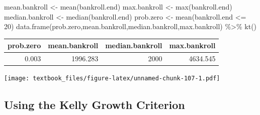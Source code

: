 \documentclass[
  11pt,
]{book}
\newenvironment{Shaded}{\begin{snugshade}}{\end{snugshade}}
\newcommand{\AttributeTok}[1]{\textcolor[rgb]{0.77,0.63,0.00}{#1}}
\newcommand{\DecValTok}[1]{\textcolor[rgb]{0.00,0.00,0.81}{#1}}
\newcommand{\FunctionTok}[1]{\textcolor[rgb]{0.00,0.00,0.00}{#1}}
\newcommand{\NormalTok}[1]{#1}
\newcommand{\OtherTok}[1]{\textcolor[rgb]{0.56,0.35,0.01}{#1}}
\newcommand{\SpecialCharTok}[1]{\textcolor[rgb]{0.00,0.00,0.00}{#1}}
\newcommand{\StringTok}[1]{\textcolor[rgb]{0.31,0.60,0.02}{#1}}
\theoremstyle{definition}
\theoremstyle{definition}
\theoremstyle{definition}
\theoremstyle{definition}
\theoremstyle{remark}
\begin{document}
\begin{Shaded}
\begin{Highlighting}[]
\NormalTok{mean.bankroll }\OtherTok{\textless{}{-}} \FunctionTok{mean}\NormalTok{(bankroll.end)}
\NormalTok{max.bankroll }\OtherTok{\textless{}{-}} \FunctionTok{max}\NormalTok{(bankroll.end)}
\NormalTok{median.bankroll }\OtherTok{\textless{}{-}} \FunctionTok{median}\NormalTok{(bankroll.end)}
\NormalTok{prob.zero }\OtherTok{\textless{}{-}} \FunctionTok{mean}\NormalTok{(bankroll.end }\SpecialCharTok{\textless{}=} \DecValTok{20}\NormalTok{)}
\FunctionTok{data.frame}\NormalTok{(prob.zero,mean.bankroll,median.bankroll,max.bankroll) }\SpecialCharTok{\%\textgreater{}\%} \FunctionTok{kt}\NormalTok{()}
\end{Highlighting}
\end{Shaded}

\begin{table}[H]
\centering
\begin{tabular}{rrrr}
\toprule
prob.zero & mean.bankroll & median.bankroll & max.bankroll\\
\midrule
0.003 & 1996.283 & 2000 & 4634.545\\
\bottomrule
\end{tabular}
\end{table}

\begin{Shaded}
\end{Shaded}

\texttt{[image: textbook\_files/figure-latex/unnamed-chunk-107-1.pdf]}

\newpage

\hypertarget{using-the-kelly-growth-criterion}{%
\subsection{Using the Kelly Growth Criterion}\label{using-the-kelly-growth-criterion}}
\end{document}
